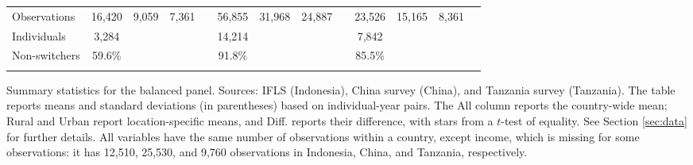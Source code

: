 \begin{table}
\begin{threeparttable}
\begin{tabular}{l cccc cccc cccc}
\cmidrule(lr){2-13}
Observations & 16,420 & 9,059 & 7,361 &  & 56,855 & 31,968 & 24,887 &  & 23,526 & 15,165 & 8,361 &  \\  \addlinespace
Individuals & 3,284 &  &  &  & 14,214 &  &  &  & 7,842 &  &  &  \\
Non-switchers &   59.6\% &  &  &  &   91.8\% &  &  &  &   85.5\% &  &  &  \\  \addlinespace
\bottomrule \end{tabular} \begin{tablenotes}[flushleft] \footnotesize \item{Summary statistics for the balanced panel. Sources: IFLS (Indonesia), China survey (China), and Tanzania survey (Tanzania). The table reports means and standard deviations (in parentheses) based on individual-year pairs. The All column reports the country-wide mean; Rural and Urban report location-specific means, and Diff. reports their difference, with stars from a $t$-test of equality. See Section \ref{sec:data} for further details. All variables have the same number of observations within a country, except income, which is missing for some observations: it has 12,510, 25,530, and 9,760 observations in Indonesia, China, and Tanzania, respectively.} \end{tablenotes}
\end{threeparttable}
\end{table}
